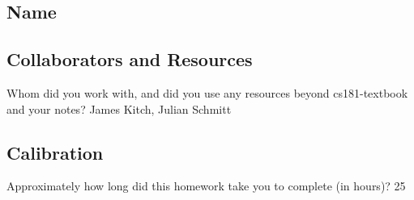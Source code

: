 \documentclass[submit]{harvardml}
\begin{document}
\newpage
\subsection*{Name}

\subsection*{Collaborators and Resources}
Whom did you work with, and did you use any resources beyond cs181-textbook and your notes?
James Kitch, Julian Schmitt

\subsection*{Calibration}
Approximately how long did this homework take you to complete (in hours)? 25
\end{document}
